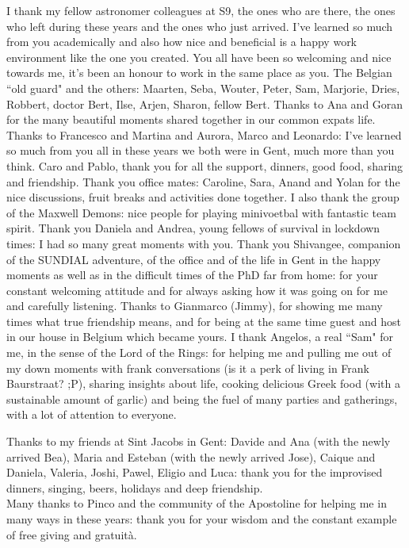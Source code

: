 {I thank my fellow astronomer colleagues at S9, the ones who are there, the ones who left during these years and the ones who just arrived.
I've learned so much from you academically and also how nice and beneficial is a happy work environment like the one you created.
You all have been so welcoming and nice towards me, it's been an honour to work in the same place as you.
The Belgian ``old guard" and the others: Maarten, Seba, Wouter, Peter, Sam, Marjorie, Dries, Robbert, doctor Bert, Ilse, Arjen, Sharon, fellow Bert.
Thanks to Ana and Goran for the many beautiful moments shared together in our common expats life.
Thanks to Francesco and Martina and Aurora, Marco and Leonardo: I've learned so much from you all in these years we both were in Gent, much more than you think.
Caro and Pablo, thank you for all the support, dinners, good food, sharing and friendship.
Thank you office mates: Caroline, Sara, Anand and Yolan for the nice discussions, fruit breaks and activities done together.
I also thank the group of the Maxwell Demons: nice people for playing minivoetbal with fantastic team spirit.
Thank you Daniela and Andrea, young fellows of survival in lockdown times: I had so many great moments with you.
Thank you Shivangee, companion of the SUNDIAL adventure, of the office and of the life in Gent in the happy moments as well as in the difficult times of the PhD far from home: for your constant welcoming attitude and for always asking how it was going on for me and carefully listening.
Thanks to Gianmarco (Jimmy), for showing me many times what true friendship means, and for being at the same time guest and host in our house in Belgium which became yours.
I thank Angelos, a real ``Sam" for me, in the sense of the Lord of the Rings: for helping me %
and pulling me out of my down moments with frank conversations (is it a perk of living in Frank Baurstraat? ;P), sharing insights about life, cooking delicious Greek food (with a sustainable amount of garlic) and being the fuel of many parties and gatherings, with a lot of attention to everyone.

Thanks to my friends at Sint Jacobs in Gent: Davide and Ana (with the newly arrived Bea), Maria and Esteban (with the newly arrived Jose), Caique and Daniela, Valeria, Joshi, Pawel, Eligio and Luca: thank you for the improvised dinners, singing, beers, holidays and deep friendship.\\
Many thanks to Pinco and the community of the Apostoline for helping me in many ways in these years: thank you for your wisdom and the constant example of free giving and gratuità.

}
